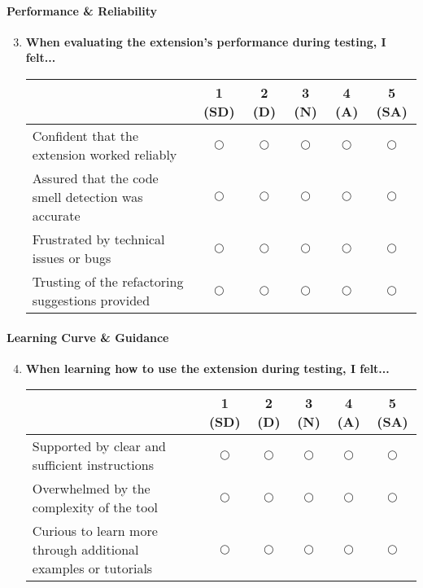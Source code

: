 \documentclass{article}
\begin{document}
\paragraph{Performance \& Reliability}
\begin{enumerate}
    \setcounter{enumi}{2}
    \item \textbf{When evaluating the extension's performance during testing, I felt...}
    
    \begin{tabularx}{\textwidth}{|X|c|c|c|c|c|}
        \hline
        & 1 (SD) & 2 (D) & 3 (N) & 4 (A) & 5 (SA) \\
        \hline
        Confident that the extension worked reliably & $\bigcirc$ & $\bigcirc$ & $\bigcirc$ & $\bigcirc$ & $\bigcirc$ \\
        \hline
        Assured that the code smell detection was accurate & $\bigcirc$ & $\bigcirc$ & $\bigcirc$ & $\bigcirc$ & $\bigcirc$ \\
        \hline
        Frustrated by technical issues or bugs & $\bigcirc$ & $\bigcirc$ & $\bigcirc$ & $\bigcirc$ & $\bigcirc$ \\
        \hline
        Trusting of the refactoring suggestions provided & $\bigcirc$ & $\bigcirc$ & $\bigcirc$ & $\bigcirc$ & $\bigcirc$ \\
        \hline
    \end{tabularx}
\end{enumerate}

\paragraph{Learning Curve \& Guidance}
\begin{enumerate}
    \setcounter{enumi}{3}
    \item \textbf{When learning how to use the extension during testing, I felt...}
    
    \begin{tabularx}{\textwidth}{|X|c|c|c|c|c|}
        \hline
        & 1 (SD) & 2 (D) & 3 (N) & 4 (A) & 5 (SA) \\
        \hline
        Supported by clear and sufficient instructions & $\bigcirc$ & $\bigcirc$ & $\bigcirc$ & $\bigcirc$ & $\bigcirc$ \\
        \hline
        Overwhelmed by the complexity of the tool & $\bigcirc$ & $\bigcirc$ & $\bigcirc$ & $\bigcirc$ & $\bigcirc$ \\
        \hline
        Curious to learn more through additional examples or tutorials & $\bigcirc$ & $\bigcirc$ & $\bigcirc$ & $\bigcirc$ & $\bigcirc$ \\
        \hline
    \end{tabularx}
\end{enumerate}
\end{document}
